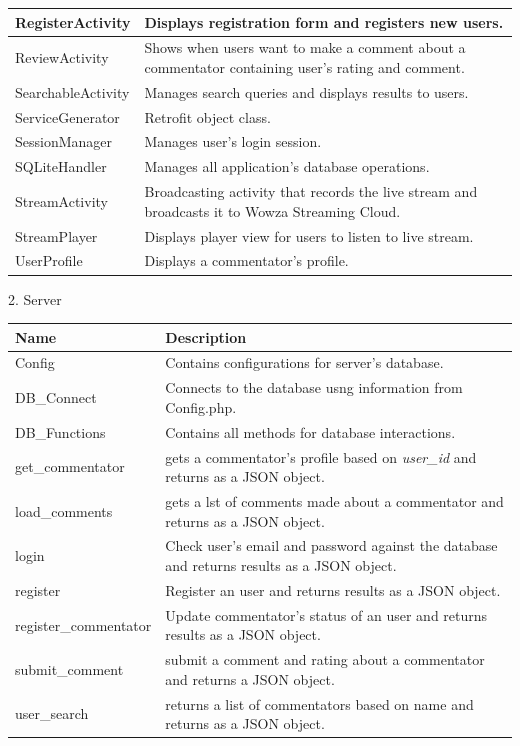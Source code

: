 \documentclass{article}
\begin{document}
\begin{flushleft}
\begin{longtable}[l]{|l|p{10cm}|}
\hline
RegisterActivity & Displays registration form and registers new users.\\
\hline
ReviewActivity & Shows when users want to make a comment about a commentator containing user's rating and comment.\\
\hline
SearchableActivity & Manages search queries and displays results to users.\\
\hline
ServiceGenerator & Retrofit object class.\\
\hline
SessionManager & Manages user's login session.\\
\hline
SQLiteHandler & Manages all application's database operations.\\
\hline
StreamActivity & Broadcasting activity that records the live stream and broadcasts it to Wowza Streaming Cloud.\\
\hline
StreamPlayer & Displays player view for users to listen to live stream.\\
\hline
UserProfile & Displays a commentator's profile.\\
\hline
\end{longtable}
{\large 2. Server}\par
\begin{longtable}[l]{|l|p{10cm}|}
\hline
\textbf{Name} & \textbf{Description}\\
\hline
Config & Contains configurations for server's database.\\
\hline
DB\_Connect & Connects to the database usng information from Config.php.\\
\hline
DB\_Functions & Contains all methods for database interactions.\\
\hline
get\_commentator & gets a commentator's profile based on \textit{user\_id} and returns as a JSON object.\\
\hline
load\_comments & gets a lst of comments made about a commentator and returns as a JSON object.\\
\hline
login & Check user's email and password against the database and returns results as a JSON object.\\
\hline
register & Register an user and returns results as a JSON object.\\
\hline
register\_commentator & Update commentator's status of an user and returns results as a JSON object.\\
\hline
submit\_comment & submit a comment and rating about a commentator and returns a JSON object.\\
\hline
user\_search & returns a list of commentators based on name and returns as a JSON object.\\

\end{longtable}
\end{flushleft}
\end{document}
